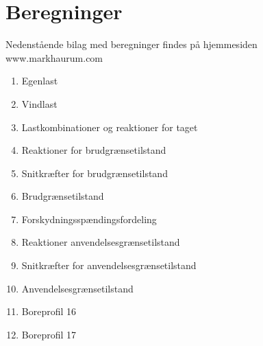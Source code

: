 \chapter{Beregninger}
Nedenstående bilag med beregninger findes på hjemmesiden www.markhaurum.com

\begin{enumerate}
	\item Egenlast
	\item Vindlast
	\item Lastkombinationer og reaktioner for taget
	\item Reaktioner for brudgrænsetilstand
	\item Snitkræfter for brudgrænsetilstand
	\item Brudgrænsetilstand
	\item Forskydningsspændingsfordeling
	\item Reaktioner anvendelsesgrænsetilstand
	\item Snitkræfter for anvendelsesgrænsetilstand
	\item Anvendelsesgrænsetilstand
	\item Boreprofil 16
	\item Boreprofil 17
\end{enumerate}